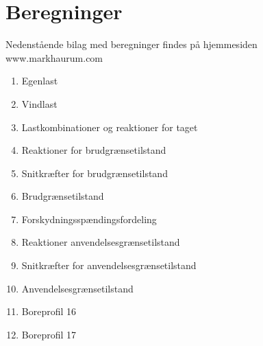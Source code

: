 \chapter{Beregninger}
Nedenstående bilag med beregninger findes på hjemmesiden www.markhaurum.com

\begin{enumerate}
	\item Egenlast
	\item Vindlast
	\item Lastkombinationer og reaktioner for taget
	\item Reaktioner for brudgrænsetilstand
	\item Snitkræfter for brudgrænsetilstand
	\item Brudgrænsetilstand
	\item Forskydningsspændingsfordeling
	\item Reaktioner anvendelsesgrænsetilstand
	\item Snitkræfter for anvendelsesgrænsetilstand
	\item Anvendelsesgrænsetilstand
	\item Boreprofil 16
	\item Boreprofil 17
\end{enumerate}